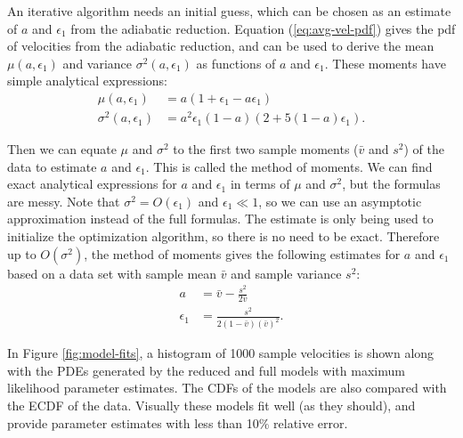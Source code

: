 An iterative algorithm needs an initial guess, which can be chosen as
an estimate of $a$ and $\epsilon_1$ from the adiabatic
reduction. Equation (\ref{eq:avg-vel-pdf}) gives the pdf of velocities
from the adiabatic reduction, and can be used to derive the mean
$\mu(a, \epsilon_1)$ and variance $\sigma^2(a, \epsilon_1)$ as
functions of $a$ and $\epsilon_1$. These moments have simple
analytical expressions:
\begin{align}
  \label{eq:mean-ar}
  \mu(a, \epsilon_1) &= a(1 + \epsilon_1 - a \epsilon_1) \\
  \label{eq:var-ar}
  \sigma^2(a, \epsilon_1) &= a^2 \epsilon_1 (1 - a) (2 + 5(1 - a) \epsilon_1).
\end{align}

Then we can equate $\mu$ and $\sigma^2$ to the first two sample
moments ($\bar{v}$ and $s^2$) of the data to estimate $a$ and
$\epsilon_1$. This is called the method of moments. We can find exact
analytical expressions for $a$ and $\epsilon_1$ in terms of $\mu$ and
$\sigma^2$, but the formulas are messy. Note that
$\sigma^2 = O(\epsilon_1)$ and $\epsilon_1 \ll 1$, so we can use an
asymptotic approximation instead of the full formulas. The estimate is
only being used to initialize the optimization algorithm, so there is
no need to be exact. Therefore up to $O(\sigma^2)$, the method of
moments gives the following estimates for $a$ and $\epsilon_1$ based on
a data set with sample mean $\bar{v}$ and sample variance $s^2$:
\begin{align}
  \label{eq:mean-est}
  a &= \bar{v} - \frac{s^2}{2\bar{v}} \\
  \label{eq:var-est}
  \epsilon_1 &= \frac{s^2}{2(1 - \bar{v})(\bar{v})^2}.
\end{align}

In Figure \ref{fig:model-fits}, a histogram of 1000 sample velocities
is shown along with the PDEs generated by the reduced and full models
with maximum likelihood parameter estimates. The CDFs of the models
are also compared with the ECDF of the data. Visually these models fit
well (as they should), and provide parameter estimates with less than
10\% relative error.

